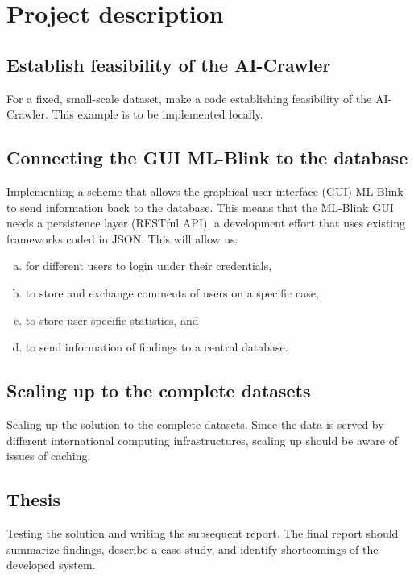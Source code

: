 \section{Project description}


\subsection{Establish feasibility of the AI-Crawler}

For a fixed, small-scale dataset, make a code establishing feasibility of the AI-Crawler. This example is to be implemented locally.

\subsection{Connecting the GUI ML-Blink to the database}

Implementing a scheme that allows the graphical user interface (GUI) ML-Blink to send information back to the database. This means that the ML-Blink GUI needs a persistence layer (RESTful API), a development effort that uses existing frameworks coded in JSON.  This will allow us:

\begin{enumerate}[(a)]
  \item for different users to login under their credentials,
  \item to store and exchange comments of users on a specific case,
  \item to store user-specific statistics, and
  \item to send information of findings to a central database.
\end{enumerate}

\subsection{Scaling up to the complete datasets}

Scaling up the solution to the complete datasets. Since the data is served by different international computing infrastructures, scaling up should be aware of issues of caching. 
 
\subsection{Thesis}

Testing the solution and writing the subsequent report. The final report should summarize findings, describe a case study, and identify shortcomings of the developed system.